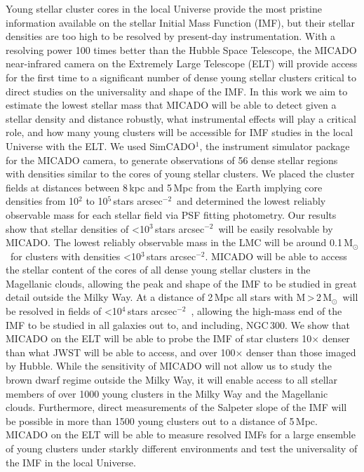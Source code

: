 \documentclass[referee]{aa}
\newcommand{\msun}{M$_\odot$~}
\newcommand{\h}[1]{$^{#1}$}
\newcommand{\spa}{stars arcsec$^{-2}$~}
\newcommand{\spae}{stars arcsec$^{-2}$}
\begin{document}
  \abstract
{Young stellar cluster cores in the local Universe provide the most pristine information available on the stellar Initial Mass Function (IMF), but their stellar densities are too high to be resolved by present-day instrumentation.
With a resolving power 100 times better than the Hubble Space Telescope, the MICADO near-infrared camera on the Extremely Large Telescope (ELT) will provide access for the first time to a significant number of dense young stellar clusters critical to direct studies on the universality and shape of the IMF.}
{In this work we aim to estimate the lowest stellar mass that MICADO will be able to detect given a stellar density and distance robustly, what instrumental effects will play a critical role, and how many young clusters will be accessible for IMF studies in the local Universe with the ELT.}
{We used SimCADO$^1$, the instrument simulator package for the MICADO camera, to generate observations of 56 dense stellar regions with densities similar to the cores of young stellar clusters.
We placed the cluster fields at distances between 8\,kpc and 5\,Mpc from the Earth implying core densities from 10\h2 to 10\h5\,\spa and determined the lowest reliably observable mass for each stellar field via PSF fitting photometry.}
{Our results show that stellar densities of \textless10\h3\,\spa will be easily resolvable by MICADO. The lowest reliably observable mass in the LMC will be around 0.1\,\msun for clusters with densities \textless10\h3\,\spae.
MICADO will be able to access the stellar content of the cores of all dense young stellar clusters in the Magellanic clouds, allowing the peak and shape of the IMF to be studied in great detail outside the Milky Way.
At a distance of 2\,Mpc all stars with M\,\textgreater\,2\,\msun will be resolved in fields of \textless10\h4\,\spa, allowing the high-mass end of the IMF to be studied in all galaxies out to, and including, NGC\,300.}
{We show that MICADO on the ELT will be able to probe the IMF of star clusters 10$\times$ denser than what JWST will be able to access, and over 100$\times$ denser than those imaged by Hubble.
While the sensitivity of MICADO will not allow us to study the brown dwarf regime outside the Milky Way, it will enable access to all stellar members of over 1000 young clusters in the Milky Way and the Magellanic clouds.
Furthermore, direct measurements of the Salpeter slope of the IMF will be possible in more than 1500 young clusters out to a distance of 5\,Mpc.
MICADO on the ELT will be able to measure resolved IMFs for a large ensemble of young clusters under starkly different environments and test the universality of the IMF in the local Universe.}
\end{document}
